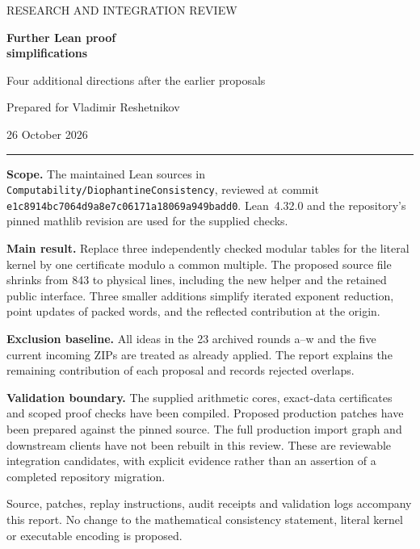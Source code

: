 \documentclass[11pt,letterpaper]{article}
\newcommand{\code}[1]{\nolinkurl{#1}}
\newcommand{\commit}{\texttt{e1c8914bc7064d9a8e7c06171a18069a949badd0}}
\begin{document}
\begin{titlepage}
\vspace*{0.35in}
{\sffamily\small\color{accent} RESEARCH AND INTEGRATION REVIEW\par}
\vspace{0.18in}
{\sffamily\Huge\bfseries\color{ink} Further Lean proof\\simplifications\par}
\vspace{0.16in}
{\sffamily\Large Four additional directions after the earlier proposals\par}
\vspace{0.32in}
{\large Prepared for Vladimir Reshetnikov\par}
26 October 2026
\vspace{0.3in}
\hrule
\vspace{0.18in}
\textbf{Scope.} The maintained Lean sources in \code{Computability/DiophantineConsistency}, reviewed at commit \commit. Lean~4.32.0 and the repository's pinned mathlib revision are used for the supplied checks.

\textbf{Main result.} Replace three independently checked modular tables for the literal kernel by one certificate modulo a common multiple. The proposed source file shrinks from 843 to \CommonNewLines{} physical lines, including the new helper and the retained public interface. Three smaller additions simplify iterated exponent reduction, point updates of packed words, and the reflected contribution at the origin.

\textbf{Exclusion baseline.} All ideas in the 23 archived rounds a--w and the five current incoming ZIPs are treated as already applied. The report explains the remaining contribution of each proposal and records rejected overlaps.

\textbf{Validation boundary.} The supplied arithmetic cores, exact-data certificates and scoped proof checks have been compiled. Proposed production patches have been prepared against the pinned source. The full production import graph and downstream clients have not been rebuilt in this review. These are reviewable integration candidates, with explicit evidence rather than an assertion of a completed repository migration.
\vfill
{\sffamily\small Source, patches, replay instructions, audit receipts and validation logs accompany this report. No change to the mathematical consistency statement, literal kernel or executable encoding is proposed.\par}
\end{titlepage}
\tableofcontents
\newpage
\end{document}
